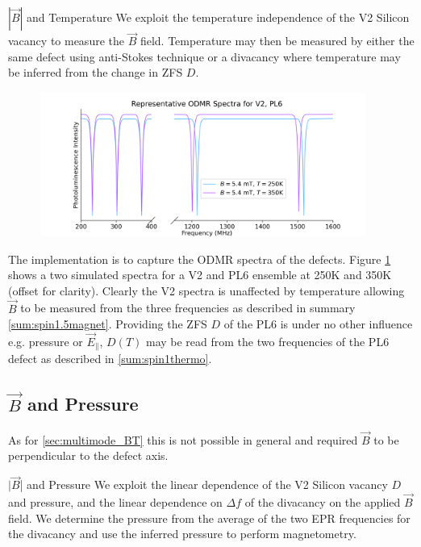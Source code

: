 \begin{proposal}{$|\vec{B}|$ and Temperature}
	We exploit the temperature independence of the V2 Silicon vacancy to measure the $\vec{B}$ field. Temperature may then be measured by either the same defect using anti-Stokes technique or a divacancy where temperature may be inferred from the change in ZFS $D$.
\end{proposal}
\begin{figure}[h]
	\begin{center}
		\includegraphics[width=0.95\textwidth]{figures/ODMR-multimodal-s15magnet-s1T.png}
	\end{center}
	\caption{}\label{fig:multimode_BT}
\end{figure}
The implementation is to capture the ODMR spectra of the defects. Figure \ref{fig:multimode_BT} shows a two simulated spectra for a V2 and PL6 ensemble at 250K and 350K (offset for clarity). Clearly the V2 spectra is unaffected by temperature allowing $\vec{B}$ to be measured from the three frequencies as described in summary \ref{sum:spin1.5magnet}. Providing the ZFS $D$ of the PL6 is under no other influence e.g. pressure or $\vec{E}_\parallel$, $D(T)$ may be read from the two frequencies of the PL6 defect as described in \ref{sum:spin1thermo}.





\subsection{$\vec{B}$ and Pressure}
As for \ref{sec:multimode_BT} this is not possible in general and required $\vec{B}$ to be perpendicular to the defect axis. 

\begin{proposal}{$|\vec{B}$| and Pressure}
	We exploit the linear dependence of the V2 Silicon vacancy $D$ and pressure, and the linear dependence on $\Delta f$ of the divacancy on the applied $\vec{B}$ field. We determine the pressure from the average of the two EPR frequencies for the divacancy and use the inferred pressure to perform magnetometry. 

\end{proposal}

